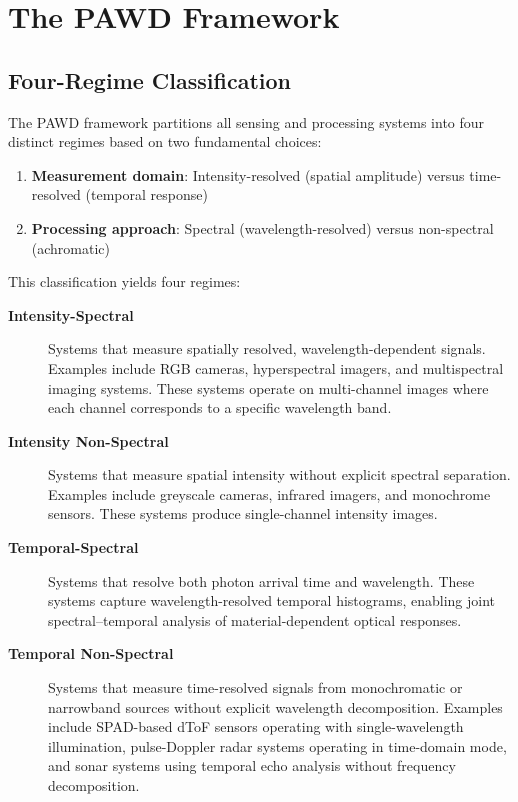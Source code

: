 \documentclass[11pt]{article}
\begin{document}
\section{The PAWD Framework}

\subsection{Four-Regime Classification}

The PAWD framework partitions all sensing and processing systems into four distinct regimes based on two fundamental choices:

\begin{enumerate}
    \item \textbf{Measurement domain}: Intensity-resolved (spatial amplitude) versus time-resolved (temporal response)
    \item \textbf{Processing approach}: Spectral (wavelength-resolved) versus non-spectral (achromatic)
\end{enumerate}

This classification yields four regimes:

\begin{description}
    \item[\textbf{Intensity-Spectral}] Systems that measure spatially resolved, wavelength-dependent signals. Examples include RGB cameras, hyperspectral imagers, and multispectral imaging systems. These systems operate on multi-channel images where each channel corresponds to a specific wavelength band.
    
    \item[\textbf{Intensity Non-Spectral}] Systems that measure spatial intensity without explicit spectral separation. Examples include greyscale cameras, infrared imagers, and monochrome sensors. These systems produce single-channel intensity images.
    
    \item[\textbf{Temporal-Spectral}] Systems that resolve both photon arrival time and wavelength. These systems capture wavelength-resolved temporal histograms, enabling joint spectral--temporal analysis of material-dependent optical responses.
    
    \item[\textbf{Temporal Non-Spectral}] Systems that measure time-resolved signals from monochromatic or narrowband sources without explicit wavelength decomposition. Examples include SPAD-based dToF sensors operating with single-wavelength illumination, pulse-Doppler radar systems operating in time-domain mode, and sonar systems using temporal echo analysis without frequency decomposition.
\end{description}
\end{document}
